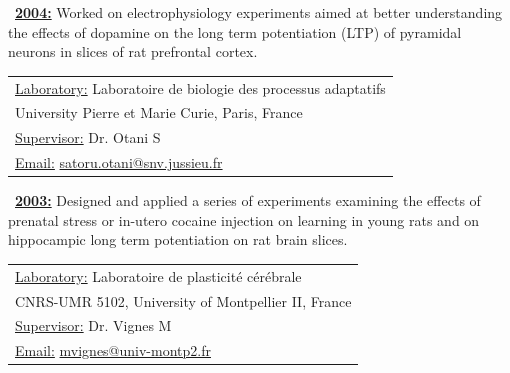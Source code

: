 \documentclass[a4paper,12pt,oneside]{letter}
\begin{document}
{\begin{minipage}[c]{6.7cm}
\textbullet~\underline{\textbf{2004:}}	Worked on electrophysiology experiments aimed at better understanding the effects of dopamine on the long term potentiation (LTP) of pyramidal neurons in slices of rat prefrontal cortex.
\end{minipage}
\hspace{3mm}
\begin{minipage}[c]{\textwidth}
\setlength\minrowclearance{0.1cm}
\setlength\arrayrulewidth{1.5pt}
\small
\begin{tabular}[c]{|l|}\hline
\underline{Laboratory:} Laboratoire de biologie des processus adaptatifs\\
University Pierre et Marie Curie, Paris, France\\
\underline{Supervisor:} Dr. Otani S\\
\underline{Email:} \href{mailto:satoru.otani@snv.jussieu.fr}{satoru.otani@snv.jussieu.fr}\\ \hline
\end{tabular}
\end{minipage}

\begin{minipage}[c]{7.7cm}
\textbullet~\underline{\textbf{2003:}}	Designed and applied a series of experiments examining the effects of prenatal stress or in-utero cocaine injection on learning in young rats and on hippocampic long term potentiation on rat brain slices.
\end{minipage}
\hspace{3mm}
\begin{minipage}[c]{\textwidth}
\setlength\minrowclearance{0.1cm}
\setlength\arrayrulewidth{1.5pt}
\small
\begin{tabular}[c]{|l|}\hline
\underline{Laboratory:} Laboratoire de plasticité cérébrale\\
CNRS-UMR 5102, University of Montpellier II, France\\
\underline{Supervisor:} Dr. Vignes M\\
\underline{Email:} \href{mailto:mvignes@univ-montp2.fr}{mvignes@univ-montp2.fr}\\ \hline
\end{tabular}
\end{minipage}
 

}
\end{document}
